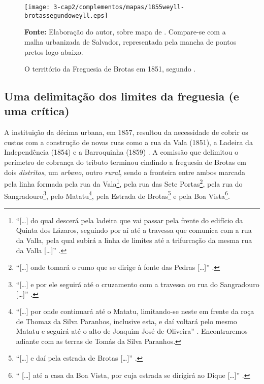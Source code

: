 \begin{sidewaysfigure}[!htp]
\texttt{[image: 3-cap2/complementos/mapas/1855weyll-brotassegundoweyll.eps]}{\footnotesize \par \textbf{Fonte:} Elaboração do autor, sobre mapa de . Compare-se com a malha urbanizada de Salvador, representada pela mancha de pontos pretos logo abaixo. \par}
\caption{O território da Freguesia de Brotas em 1851, segundo .}
\end{sidewaysfigure}

\subsection{Uma delimitação dos limites da freguesia (e uma crítica)}

A instituição da décima urbana, em 1857, resultou da necessidade de cobrir os custos com a construção de novas ruas como a rua da Vala (1851), a Ladeira da Independência (1854) e a Barroquinha (1859) \cite[p.~309]{ruy_camara_1953}. A comissão que delimitou o perímetro de cobrança do tributo terminou cindindo a freguesia de Brotas em dois \textit{distritos}, um \textit{urbano}, outro \textit{rural}, sendo a fronteira entre ambos marcada pela linha formada pela rua da Vala\footnote{``[\dots] do qual descerá pela ladeira que vai passar pela frente do edifício da Quinta dos Lázaros, seguindo por aí até a travessa que comunica com a rua da Valla, pela qual subirá a linha de limites até a trifurcação da mesma rua da Valla [\dots]'' \cite[pp.~309-310]{ruy_camara_1953}.}, pela rua das Sete Portas\footnote{``[\dots] onde tomará o rumo que se dirige à fonte das Pedras [\dots]'' \cite[pp.~309-310]{ruy_camara_1953}.}, pela rua do Sangradouro\footnote{``[\dots] e por ele seguirá até o cruzamento com a travessa ou rua do Sangradouro [\dots]'' \cite[p.~310]{ruy_camara_1953}.}, pelo Matatu\footnote{``[\dots] por onde continuará até o Matatu, limitando-se neste em frente da roça de Thomaz da Silva Paranhos, inclusive esta, e daí voltará pelo mesmo Matatu e seguirá até o alto de Joaquim José de Oliveira'' \cite[p.~310]{ruy_camara_1953}. Encontraremos adiante com as terras de Tomás da Silva Paranhos.}, pela Estrada de Brotas\footnote{``[\dots] e daí pela estrada de Brotas [\dots]'' \cite[p.~310]{ruy_camara_1953}.} e pela Boa Vista\footnote{`` [\dots] até a casa da Boa Vista, por cuja estrada se dirigirá ao Dique [\dots]'' \cite[p.~310]{ruy_camara_1953}.}. 

